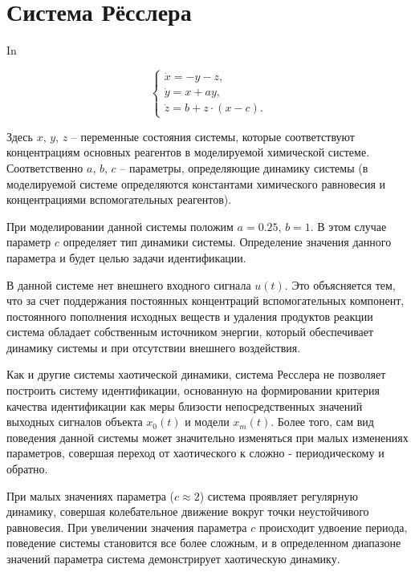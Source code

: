 
\FloatBarrier
\section{Система Рёсслера} %


In~\cite{neimark_stoch_chaos_vibro,koltsova_nl_dyn_chem,berje_order_in_chaos,chulichkcov_mm_ml_dyn}

\begin{equation}
\begin{cases}
  \dot{x}  = -y - z  ,  \\
  \dot{y}  = x + a y ,\\
  \dot{z}  = b + z \cdot ( x-c ) .
\end{cases}
\label{atu:eq:rossler}
\end{equation}

Здесь \(x\), \(y\), \(z\) -- переменные состояния системы,
которые соответствуют концентрациям основных реагентов
в моделируемой химической системе.
Соответственно \(a\), \(b\), \(c\) --
параметры, определяющие динамику системы
(в моделируемой системе определяются константами химического равновесия
и концентрациями вспомогательных реагентов).

При моделировании данной системы положим
\(a=0.25\), \(b=1\).
В этом случае параметр \(c\) определяет
тип динамики системы. 
Определение значения данного параметра и будет
целью задачи идентификации.

В данной системе нет внешнего входного сигнала \( u(t) \).
Это объясняется тем, что за счет 
поддержания постоянных концентраций вспомогательных
компонент, постоянного пополнения исходных веществ
и удаления продуктов реакции система обладает
собственным источником энергии, который обеспечивает
динамику системы и при отсутствии 
внешнего воздействия.

Как и другие системы хаотической динамики, система Ресслера
не позволяет построить систему идентификации, основанную
на формировании критерия качества идентификации 
как меры близости непосредственных значений выходных сигналов 
объекта \( x_0(t) \) и модели \( x_m(t) \).
Более того, сам вид поведения данной системы может значительно изменяться
при малых изменениях параметров, совершая переход от
хаотического к сложно - периодическому и обратно.

При малых значениях параметра (\(c \approx 2 \))
система проявляет регулярную динамику,
совершая колебательное движение вокруг точки неустойчивого равновесия.
При увеличении значения параметра \(c\) происходит удвоение периода,
поведение системы становится все более сложным, и в определенном
диапазоне значений параметра система демонстрирует хаотическую динамику.

